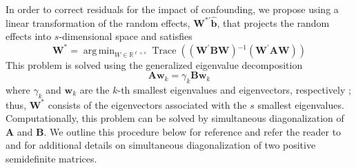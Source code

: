 \documentclass[12pt]{article} %
\newcommand{\inv}{\ensuremath{^{-1}}}
\newcommand{\ginv}{\ensuremath{^{-}}}
\newcommand{\trans}{\ensuremath{^\prime}}
\DeclareMathOperator{\tr}{Trace}
\DeclareMathOperator*{\argmin}{arg\,min}
\begin{document}
In order to correct residuals for the impact of confounding, we propose using a linear transformation of the random effects, $\bm{W}^{*\prime} \widehat{\bm{b}}$, that projects the random effects into $s$-dimensional space and satisfies
\begin{equation}\label{eq:minimize}
\bm{W}^* = \argmin_{W \in \mathbb{R}^{\ell \times s} } 
\tr\left( \left(\bm{W\trans B W} \right)\inv \left(\bm{W\trans A W}\right) \right)
\end{equation}
This problem is solved using the generalized eigenvalue decomposition
\begin{equation}\label{eq:geigen}
	\bm{Aw}_k = \gamma_k \bm{Bw}_k
\end{equation}
where $\gamma_k$ and $\bm{w}_k$ are the $k$-th smallest eigenvalues and eigenvectors, respectively \citep{Fukunaga:1990}; thus, $\bm{W}^*$ consists of the eigenvectors associated with the $s$ smallest eigenvalues. Computationally, this problem can be solved by simultaneous diagonalization of $\bm{A}$ and $\bm{B}$. We outline this procedure below for reference and refer the reader to \cite{McDonald:1979ca} and \cite{deLeeuw:1982to} for additional details on simultaneous diagonalization of two positive semidefinite matrices.\\
\end{document}
